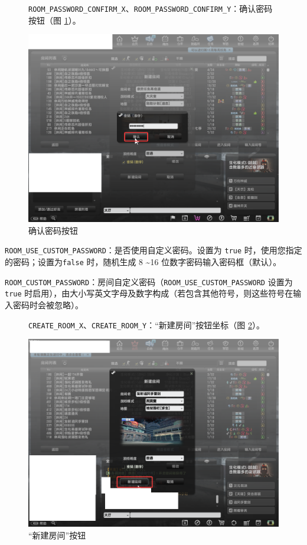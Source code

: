 \begin{figure}[H]
    \Centering
    \parbox[l]{\textwidth}{\lstinline{ROOM_PASSWORD_CONFIRM_X}、\lstinline{ROOM_PASSWORD_CONFIRM_Y}：确认密码按钮（图 \ref{ch2fig-confirm-password}）。}
    \includegraphics[width=\textwidth]{docs/assets/confirm_password.png}
    \caption{确认密码按钮}
    \label{ch2fig-confirm-password}
\end{figure}
\clearpage

\lstinline{ROOM_USE_CUSTOM_PASSWORD}：是否使用自定义密码。设置为 \lstinline{true} 时，使用您指定的密码；设置为\lstinline{false} 时，随机生成 8 \textasciitilde 16 位数字密码输入密码框（默认）。

\lstinline{ROOM_CUSTOM_PASSWORD}：房间自定义密码（\lstinline{ROOM_USE_CUSTOM_PASSWORD} 设置为 \lstinline{true} 时启用），由大小写英文字母及数字构成（若包含其他符号，则这些符号在输入密码时会被忽略）。

\begin{figure}[H]
    \Centering
    \parbox[l]{\textwidth}{\lstinline{CREATE_ROOM_X}、\lstinline{CREATE_ROOM_Y}：“新建房间”按钮坐标（图 \ref{ch2fig-create-room-1}）。}
    \includegraphics[width=\textwidth]{docs/assets/create_room_1.png}
    \caption{“新建房间”按钮}
    \label{ch2fig-create-room-1}
\end{figure}
\clearpage

